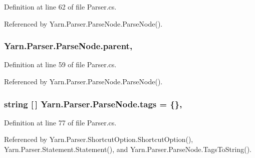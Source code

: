 Definition at line 62 of file Parser.\-cs.



Referenced by Yarn.\-Parser.\-Parse\-Node.\-Parse\-Node().

\hypertarget{a00148_af313a82103fcc2ff5a177dbb06b92f7b}{
\subsubsection[{parent}]{ Yarn.\-Parser.\-Parse\-Node.\-parent\hspace{0.3cm}{\ttfamily [package]}, {\ttfamily [inherited]}}}\label{a00148_af313a82103fcc2ff5a177dbb06b92f7b}


Definition at line 59 of file Parser.\-cs.



Referenced by Yarn.\-Parser.\-Parse\-Node.\-Parse\-Node().

\hypertarget{a00148_a58b3a15788fd2d4127d73619dc6d04ae}{
\subsubsection[{tags}]{\setlength{\rightskip}{0pt plus 5cm}string \mbox{[}$\,$\mbox{]} Yarn.\-Parser.\-Parse\-Node.\-tags = \{\}\hspace{0.3cm}{\ttfamily [package]}, {\ttfamily [inherited]}}}\label{a00148_a58b3a15788fd2d4127d73619dc6d04ae}


Definition at line 77 of file Parser.\-cs.



Referenced by Yarn.\-Parser.\-Shortcut\-Option.\-Shortcut\-Option(), Yarn.\-Parser.\-Statement.\-Statement(), and Yarn.\-Parser.\-Parse\-Node.\-Tags\-To\-String().

